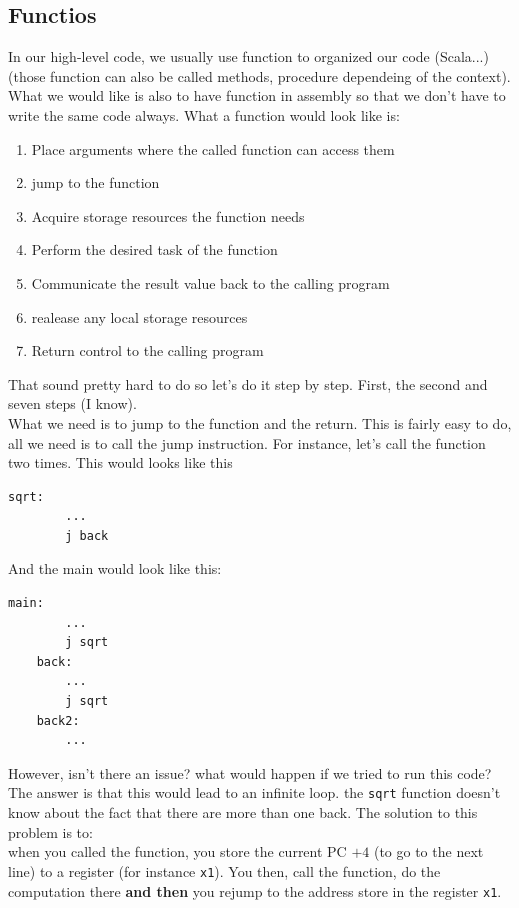 	\subsection{Functios}
	In our high-level code, we usually use function to organized our code (Scala...) (those function can also be called methods, procedure dependeing of the context).\\ 
	What we would like is also to have function in assembly so that we don't have to write the same code always. What a function would look like is:
	\begin{enumerate}
		\item Place arguments where the called function can access them 
		\item jump to the function 
		\item Acquire storage resources the function needs 
		\item Perform the desired task of the function 
		\item Communicate the result value back to the calling program 
		\item realease any local storage resources 
		\item Return control to the calling program
	\end{enumerate}
	That sound pretty hard to do so let's do it step by step. First, the second and seven steps (I know).\\
	What we need is to jump to the function and the return. This is fairly easy to do, all we need is to call the jump instruction. For instance, let's call the function two times. This  would looks like this
	\begin{lstlisting}[language={[RISC-V]Assembler}]
	sqrt:
		...
		j back
	\end{lstlisting}
	And the main would look like this:
	\begin{lstlisting}[language={[RISC-V]Assembler}]
	main: 
		...
		j sqrt 
	back:
		...
		j sqrt 
	back2:
		...
	\end{lstlisting}
	However, isn't there an issue? what would happen if we tried to run this code?\\
	The answer is that this would lead to an infinite loop. the \texttt{sqrt} function doesn't know about the fact that there are more than one back.
	The solution to this problem is to:\\
	when you called the function, you store the current PC $+ 4$  (to go to  the next line) to a register (for instance \texttt{x1}). You then, call the function, do the computation there \textbf{and then} you rejump to the address store in the register \texttt{x1}.


